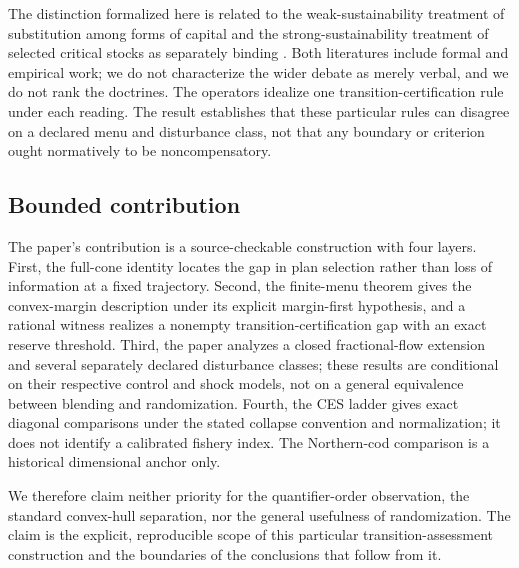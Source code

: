 The distinction formalized here is related to the weak-sustainability treatment of substitution among forms of capital and the strong-sustainability treatment of selected critical stocks as separately binding \citep{PearceAtkinson1993,Beckerman1994,Daly1995,Ayres2001,Neumayer2013,DietzNeumayer2007}. Both literatures include formal and empirical work; we do not characterize the wider debate as merely verbal, and we do not rank the doctrines. The operators idealize one transition-certification rule under each reading. The result establishes that these particular rules can disagree on a declared menu and disturbance class, not that any boundary or criterion ought normatively to be noncompensatory.

\subsection{Bounded contribution}

The paper's contribution is a source-checkable construction with four layers. First, the full-cone identity locates the gap in plan selection rather than loss of information at a fixed trajectory. Second, the finite-menu theorem gives the convex-margin description under its explicit margin-first hypothesis, and a rational witness realizes a nonempty transition-certification gap with an exact reserve threshold. Third, the paper analyzes a closed fractional-flow extension and several separately declared disturbance classes; these results are conditional on their respective control and shock models, not on a general equivalence between blending and randomization. Fourth, the CES ladder gives exact diagonal comparisons under the stated collapse convention and normalization; it does not identify a calibrated fishery index. The Northern-cod comparison is a historical dimensional anchor only.

We therefore claim neither priority for the quantifier-order observation, the standard convex-hull separation, nor the general usefulness of randomization. The claim is the explicit, reproducible scope of this particular transition-assessment construction and the boundaries of the conclusions that follow from it.
